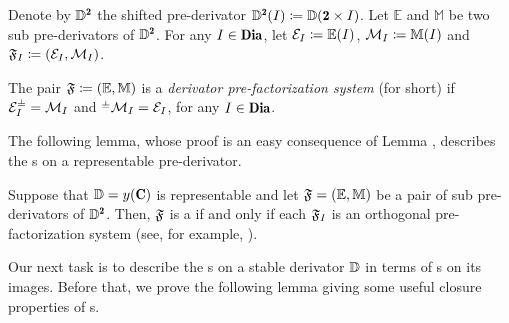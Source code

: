 \begin{definition}\label{def_phfs}
Denote by $\D^{\due}$ the shifted pre-derivator $\D^{\due}(I) \coloneqq \D(\due\times I)$. 
Let $\mathbb E$ and $\mathbb M$ be two sub pre-derivators of $\D^{\due}$.
For any $I\in \Dia$, let $\mathcal{E}_I \coloneqq \mathbb E(I)$, $\mathcal{M}_I \coloneqq \mathbb M(I)$ and $\mathfrak{F}_I \coloneqq (\mathcal{E}_I,\mathcal{M}_I)$.%

The pair $\mathfrak{F} \coloneqq (\mathbb E,\mathbb M)$ is a \emph{derivator pre-factorization system} (\cpfs for short) if $\E_I^{\corth}=\M_I$ and ${}^{\corth }\M_I=\E_I$,  for any $I\in\Dia$.
\end{definition}

The following lemma, whose proof is an easy consequence of Lemma , describes the {\cpfs}s on a representable pre-derivator.

\begin{lemma}\label{dpfs=pfs_if_discrete}
Suppose that $\D=y(\C)$ is representable and let $\mathfrak{F}=(\mathbb E,\mathbb M)$ be a pair of sub pre-derivators of $\D^\due$. Then, $\mathfrak{F}$ is a \cpfs if and only if each $\mathfrak{F}_I$ is an orthogonal pre-factorization system (see, for example, \cite[§\textbf{1}]{riehl2008factorization}).
\end{lemma}

Our next task is to describe the {\cpfs}s on a stable derivator $\mathbb{D}$ in terms of {\phfs}s on its images. Before that, we prove the following lemma giving some useful closure properties of {\cpfs}s.


